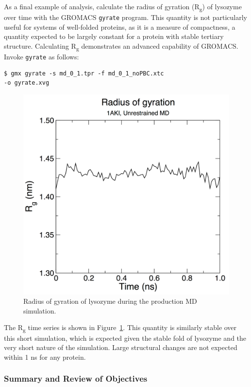 \documentclass[9pt,tutorial]{livecoms}
\begin{document}
As a final example of analysis, calculate the radius of gyration (R\textsubscript{g}) of lysozyme over time with the GROMACS \texttt{gyrate} program. This quantity is not particularly useful for systems of well-folded proteins, as it is a measure of compactness, a quantity expected to be largely constant for a protein with stable tertiary structure. Calculating R\textsubscript{g} demonstrates an advanced capability of GROMACS. Invoke \texttt{gyrate} as follows:

\begin{verbatim}
$ gmx gyrate -s md_0_1.tpr -f md_0_1_noPBC.xtc 
-o gyrate.xvg
\end{verbatim}

\begin{figure}[h]
\centering
\includegraphics{plot_lyso_md_rg}
\caption{Radius of gyration of lysozyme during the production MD simulation.}
\label{lyso_md_rg_fig}
\end{figure}

The R\textsubscript{g} time series is shown in Figure~\ref{lyso_md_rg_fig}. This quantity is similarly stable over this short simulation, which is expected given the stable fold of lysozyme and the very short nature of the simulation. Large structural changes are not expected within 1 ns for any protein.

\subsubsection{Summary and Review of Objectives} \label{lyso_summary}
\end{document}
